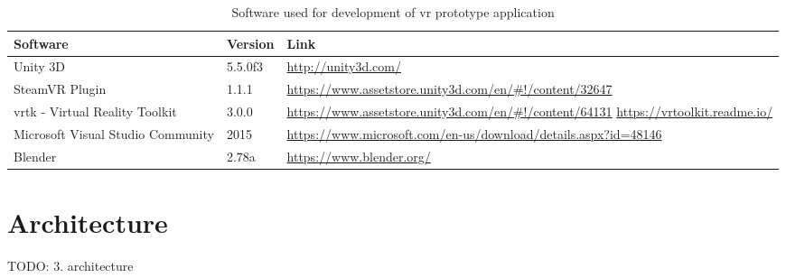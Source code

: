 \begin{table}[h]
	\begin{center}
		\begin{tabular}{ | p{3.5cm} | p{1.5cm} | p{8.5cm} | }
			\hline
				\textbf{Software} & \textbf{Version} & \textbf{Link} \\
			\hline
				Unity 3D & 5.5.0f3 & \url{http://unity3d.com/} \\
			\hline
				SteamVR Plugin & 1.1.1 & \url{https://www.assetstore.unity3d.com/en/#!/content/32647} \\
			\hline
				\gls{vrtk} - Virtual Reality Toolkit & 3.0.0 & \url{https://www.assetstore.unity3d.com/en/#!/content/64131} \newline \url{https://vrtoolkit.readme.io/} \\
			\hline
				Microsoft Visual Studio Community & 2015 & \url{https://www.microsoft.com/en-us/download/details.aspx?id=48146} \\
			\hline
				Blender & 2.78a & \url{https://www.blender.org/} \\
			\hline
		\end{tabular}
		\caption{Software used for development of \gls{vr} prototype application}
		\label{tbl:usedsoftware}
	\end{center}
\end{table}






\section{Architecture}

TODO:
3. architecture





